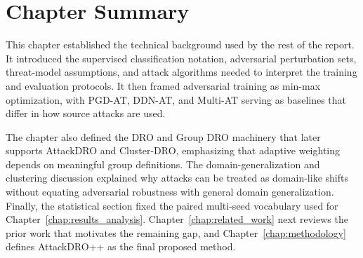 \section{Chapter Summary}

This chapter established the technical background used by the rest of the report. It introduced the supervised classification notation, adversarial perturbation sets, threat-model assumptions, and attack algorithms needed to interpret the training and evaluation protocols. It then framed adversarial training as min-max optimization, with PGD-AT, DDN-AT, and Multi-AT serving as baselines that differ in how source attacks are used.

The chapter also defined the DRO and Group DRO machinery that later supports AttackDRO and Cluster-DRO, emphasizing that adaptive weighting depends on meaningful group definitions. The domain-generalization and clustering discussion explained why attacks can be treated as domain-like shifts without equating adversarial robustness with general domain generalization. Finally, the statistical section fixed the paired multi-seed vocabulary used for Chapter~\ref{chap:results_analysis}. Chapter~\ref{chap:related_work} next reviews the prior work that motivates the remaining gap, and Chapter~\ref{chap:methodology} defines AttackDRO++ as the final proposed method.

